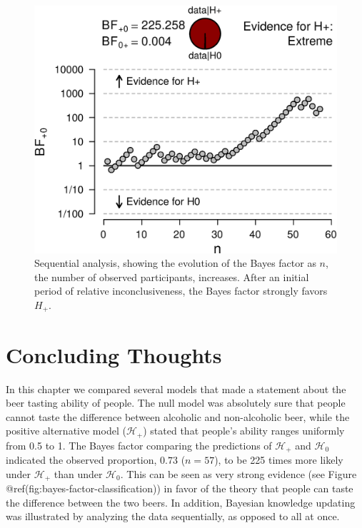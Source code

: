 \documentclass[
  letterpaper,
  DIV=11,
  numbers=noendperiod]{scrreprt}
\begin{document}
\begin{figure}

{\centering \includegraphics[width=1\textwidth,height=\textheight]{Figures/BeerSequentialAnalysis.png}

}

\caption{Sequential analysis, showing the evolution of the Bayes factor
as \(n\), the number of observed participants, increases. After an
initial period of relative inconclusiveness, the Bayes factor strongly
favors \(H_+\).}

\end{figure}

\hypertarget{concluding-thoughts-2}{%
\section{Concluding Thoughts}\label{concluding-thoughts-2}}

In this chapter we compared several models that made a statement about
the beer tasting ability of people. The null model was absolutely sure
that people cannot taste the difference between alcoholic and
non-alcoholic beer, while the positive alternative model
(\(\mathcal{H}_+\)) stated that people's ability ranges uniformly from
0.5 to 1. The Bayes factor comparing the predictions of
\(\mathcal{H}_+\) and \(\mathcal{H}_0\) indicated the observed
proportion, \(0.73\) (\(n = 57\)), to be 225 times more likely under
\(\mathcal{H}_+\) than under \(\mathcal{H}_0\). This can be seen as very
strong evidence (see Figure @ref(fig:bayes-factor-classification)) in
favor of the theory that people can taste the difference between the two
beers. In addition, Bayesian knowledge updating was illustrated by
analyzing the data sequentially, as opposed to all at once.
\end{document}
